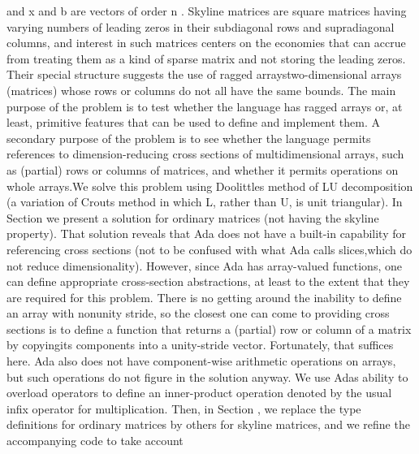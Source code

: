 \LmthEndeqn[]\EndInlEqn[] and \InlEqn[]\LmthEqn[]x
\LmthEndeqn[]\EndInlEqn[] and \InlEqn[]\LmthEqn[]b
\LmthEndeqn[]%
\EndInlEqn[] are vectors of order \InlEqn[]\LmthEqn[]n
\LmthEndeqn[]\EndInlEqn[]. Skyline matrices
are square matrices having varying numbers of leading zeros in their
subdiagonal rows and supradiagonal columns, and interest in such matrices
centers on the economies that can accrue from treating them as a kind
of sparse matrix and not storing the leading zeros. Their special
structure suggests the use of \ldquo[]ragged arrays\rdquo[]\EmDash[]two-dimensional
arrays (matrices) whose rows or columns do not all have the same bounds.
The main purpose of the problem is to test whether the language has
ragged arrays or, at least, primitive features that can be used to
define and implement them. A secondary purpose of the problem is to
see whether the language permits references to dimension-reducing
cross sections of multidimensional arrays, such as (partial) rows
or columns of matrices, and whether it permits operations on whole
arrays.\Endpara[]
\Para[]We solve this problem using Doolittle\rsquo[]s method of LU
decomposition \Endcit[] (a variation
of Crout\rsquo[]s method in which L, rather than U, is unit triangular).
In Section  we present a solution
for ordinary matrices (not having the skyline property). That solution
reveals that Ada does not have a built-in capability for referencing
cross sections (not to be confused with what Ada calls \ldquo[]slices,\rdquo[]
which do not reduce dimensionality). However, since Ada has array-valued
functions, one can define appropriate cross-section abstractions,
at least to the extent that they are required for this problem.%
\NtFoot[]\NtNtpar[]There is no getting around the inability to define
an array with nonunity stride, so the closest one can come to providing
cross sections is to define a function that returns a (partial) row
or column of a matrix by \txtxemph[]copying\txtxendemph[] its components
into a unity-stride vector. Fortunately, that suffices here.%
\NtEndntpar[]\NtEndfoot[] Ada also does not have component-wise arithmetic
operations on arrays, but such operations do not figure in the solution
anyway. We use Ada\rsquo[]s ability to overload operators to define
an inner-product operation denoted by the usual infix operator for
multiplication. Then, in Section ,
we replace the type definitions for ordinary matrices by others for
skyline matrices, and we refine the accompanying code to take account

